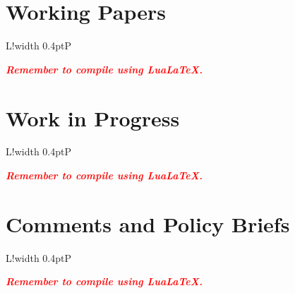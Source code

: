\documentclass[12pt, a4paper]{article}
\newcommand\VRule{\color{rulecolor}\vrule width 0.4pt}
\let\cvsectionorig\section
\renewcommand{\section}{\needspace{6\baselineskip}\cvsectionorig}
\begin{document}

\section*{Working Papers}

\ifluatex
  \begin{longtable}{L!{\VRule}P}
  \end{longtable}
\else
  \noindent \textbf{\emph{\textcolor{red}{Remember to compile using Lua\LaTeX.}}}
\fi



\section*{Work in Progress}

\ifluatex
  \begin{longtable}{L!{\VRule}P}
  \end{longtable}
\else
  \noindent \textbf{\emph{\textcolor{red}{Remember to compile using Lua\LaTeX.}}}
\fi



\section*{Comments and Policy Briefs}

\ifluatex
  \begin{longtable}{L!{\VRule}P}
  \end{longtable}
\else
  \noindent \textbf{\emph{\textcolor{red}{Remember to compile using Lua\LaTeX.}}}
\fi



\end{document}
